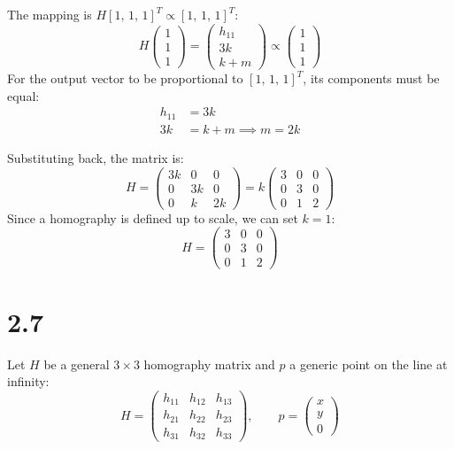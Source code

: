 \documentclass[12pt]{article}
\begin{document}
\begin{enumerate}
    The mapping is $H [1,\,1,\,1]^T \propto [1,\,1,\,1]^T$:
    \[
    H \begin{pmatrix} 1 \\ 1 \\ 1 \end{pmatrix} = \begin{pmatrix} h_{11} \\ 3k \\ k + m \end{pmatrix} \propto \begin{pmatrix} 1 \\ 1 \\ 1 \end{pmatrix}
    \]
    For the output vector to be proportional to $[1,\,1,\,1]^T$, its components must be equal:
    \begin{align*}
        h_{11} &= 3k \\
        3k &= k + m \implies m = 2k
    \end{align*}

    Substituting back, the matrix is:
    \[
    H = \begin{pmatrix}
        3k & 0 & 0 \\
        0 & 3k & 0 \\
        0 & k & 2k
    \end{pmatrix}
    = k \begin{pmatrix}
        3 & 0 & 0 \\
        0 & 3 & 0 \\
        0 & 1 & 2
    \end{pmatrix}
    \]
    Since a homography is defined up to scale, we can set $k = 1$:
    \[
    \boxed{
        H = \begin{pmatrix}
            3 & 0 & 0 \\
            0 & 3 & 0 \\
            0 & 1 & 2
        \end{pmatrix}
    }
    \]
\end{enumerate}

\section*{2.7}
    Let $H$ be a general $3 \times 3$ homography matrix and $p$ a generic point on the line at infinity:
    \[
    H = \begin{pmatrix}
    h_{11} & h_{12} & h_{13} \\
    h_{21} & h_{22} & h_{23} \\
    h_{31} & h_{32} & h_{33}
    \end{pmatrix}, \qquad
    p = \begin{pmatrix} x \\ y \\ 0 \end{pmatrix}
    \]
\end{document}
